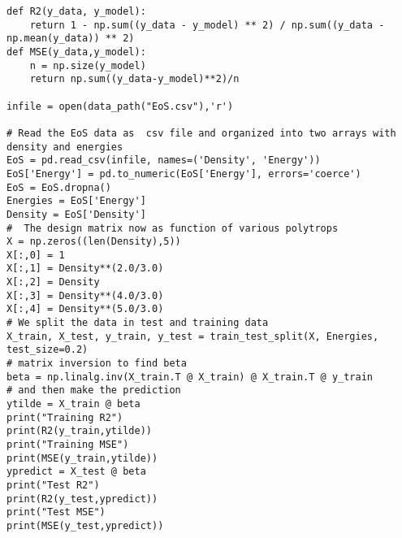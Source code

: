 \documentclass[%
oneside,                 %
final,                   %
10pt]{article}
\newenvironment{doconceexercise}{}{}
\begin{document}
\begin{doconceexercise}
\begin{verbatim}
def R2(y_data, y_model):
    return 1 - np.sum((y_data - y_model) ** 2) / np.sum((y_data - np.mean(y_data)) ** 2)
def MSE(y_data,y_model):
    n = np.size(y_model)
    return np.sum((y_data-y_model)**2)/n

infile = open(data_path("EoS.csv"),'r')

# Read the EoS data as  csv file and organized into two arrays with density and energies
EoS = pd.read_csv(infile, names=('Density', 'Energy'))
EoS['Energy'] = pd.to_numeric(EoS['Energy'], errors='coerce')
EoS = EoS.dropna()
Energies = EoS['Energy']
Density = EoS['Density']
#  The design matrix now as function of various polytrops
X = np.zeros((len(Density),5))
X[:,0] = 1
X[:,1] = Density**(2.0/3.0)
X[:,2] = Density
X[:,3] = Density**(4.0/3.0)
X[:,4] = Density**(5.0/3.0)
# We split the data in test and training data
X_train, X_test, y_train, y_test = train_test_split(X, Energies, test_size=0.2)
# matrix inversion to find beta
beta = np.linalg.inv(X_train.T @ X_train) @ X_train.T @ y_train
# and then make the prediction
ytilde = X_train @ beta
print("Training R2")
print(R2(y_train,ytilde))
print("Training MSE")
print(MSE(y_train,ytilde))
ypredict = X_test @ beta
print("Test R2")
print(R2(y_test,ypredict))
print("Test MSE")
print(MSE(y_test,ypredict))

\end{verbatim}



\end{doconceexercise}
\end{document}
